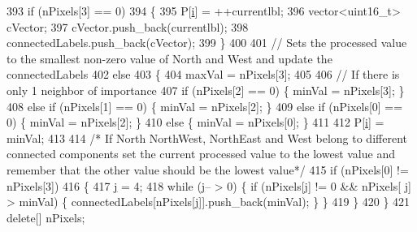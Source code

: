 \begin{DoxyCode}
393                     \textcolor{keywordflow}{if} (nPixels[3] == 0)
394                     \{
395                         P[\hyperlink{_comparision_pictures_2_createtest_image_8m_a6f6ccfcf58b31cb6412107d9d5281426}{i}] = ++currentlbl;
396                         vector<uint16\_t> cVector;
397                         cVector.push\_back(currentlbl);
398                         connectedLabels.push\_back(cVector);
399                     \}
400 
401                     \textcolor{comment}{// Sets the processed value to the smallest non-zero value of North and West and update
       the connectedLabels}
402                     \textcolor{keywordflow}{else}
403                     \{
404                         maxVal = nPixels[3];
405 
406                         \textcolor{comment}{// If there is only 1 neighbor of importance}
407                         \textcolor{keywordflow}{if} (nPixels[2] == 0) \{ minVal = nPixels[3]; \}
408                         \textcolor{keywordflow}{else} \textcolor{keywordflow}{if} (nPixels[1] == 0) \{ minVal = nPixels[2]; \}
409                         \textcolor{keywordflow}{else} \textcolor{keywordflow}{if} (nPixels[0] == 0) \{ minVal = nPixels[2]; \}
410                         \textcolor{keywordflow}{else} \{ minVal = nPixels[0]; \}
411 
412                         P[\hyperlink{_comparision_pictures_2_createtest_image_8m_a6f6ccfcf58b31cb6412107d9d5281426}{i}] = minVal;
413 
414                         \textcolor{comment}{/* If North NorthWest, NorthEast and West belong to different connected components
       set the current processed value to the lowest value and remember that the other value should be the lowest
       value*/}
415                         \textcolor{keywordflow}{if} (nPixels[0] != nPixels[3])
416                         \{
417                             \hyperlink{_comparision_pictures_2_createtest_image_8m_ac86694252f8dfdb19aaeadc4b7c342c6}{j} = 4;
418                             \textcolor{keywordflow}{while} (\hyperlink{_comparision_pictures_2_createtest_image_8m_ac86694252f8dfdb19aaeadc4b7c342c6}{j}-- > 0)    \{ \textcolor{keywordflow}{if} (nPixels[\hyperlink{_comparision_pictures_2_createtest_image_8m_ac86694252f8dfdb19aaeadc4b7c342c6}{j}] != 0 && nPixels[
      \hyperlink{_comparision_pictures_2_createtest_image_8m_ac86694252f8dfdb19aaeadc4b7c342c6}{j}] > minVal) \{ connectedLabels[nPixels[\hyperlink{_comparision_pictures_2_createtest_image_8m_ac86694252f8dfdb19aaeadc4b7c342c6}{j}]].push\_back(minVal); \} \}
419                         \}
420                     \}
421                     \textcolor{keyword}{delete}[] nPixels;

\end{DoxyCode}
